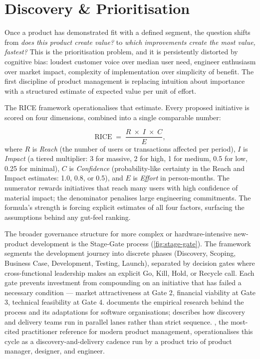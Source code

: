 \section{Discovery \& Prioritisation}\label{sec:product-discovery}

Once a product has demonstrated fit with a defined segment, the question shifts from
\emph{does this product create value?} to \emph{which improvements create the most value,
fastest?} This is the prioritisation problem, and it is persistently distorted by
cognitive bias: loudest customer voice over median user need, engineer enthusiasm over
market impact, complexity of implementation over simplicity of benefit. The first
discipline of product management is replacing intuition about importance with a
structured estimate of expected value per unit of effort.

The RICE framework operationalises that estimate. Every proposed initiative is scored
on four dimensions, combined into a single comparable number:

\begin{equation}\label{eq:rice}
  \mathrm{RICE} \;=\; \frac{R \;\times\; I \;\times\; C}{E},
\end{equation}
where \(R\) is \emph{Reach} (the number of users or transactions affected per period),
\(I\) is \emph{Impact} (a tiered multiplier: 3 for massive, 2 for high, 1 for medium,
0.5 for low, 0.25 for minimal), \(C\) is \emph{Confidence} (probability-like certainty
in the Reach and Impact estimates: 1.0, 0.8, or 0.5), and \(E\) is \emph{Effort} in
person-months. The numerator rewards initiatives that reach many users with high
confidence of material impact; the denominator penalises large engineering commitments.
The formula's strength is forcing explicit estimates of all four factors, surfacing the
assumptions behind any gut-feel ranking.

The broader governance structure for more complex or hardware-intensive new-product
development is the Stage-Gate process (\cref{fig:stage-gate}). The framework segments
the development journey into discrete phases (Discovery, Scoping, Business Case,
Development, Testing, Launch), separated by decision gates where cross-functional
leadership makes an explicit Go, Kill, Hold, or Recycle call. Each gate prevents
investment from compounding on an initiative that has failed a necessary condition ---
market attractiveness at Gate 2, financial viability at Gate 3, technical feasibility
at Gate 4. \textcite{cooper2017winning} documents the empirical research behind the
process and its adaptations for software organisations; \textcite{cagan2018inspired}
describes how discovery and delivery teams run in parallel lanes rather than strict
sequence. \textcite{cagan2018inspired}, the most-cited practitioner reference for modern product management, operationalises this cycle as a discovery-and-delivery cadence run by a product trio of product manager, designer, and engineer.


